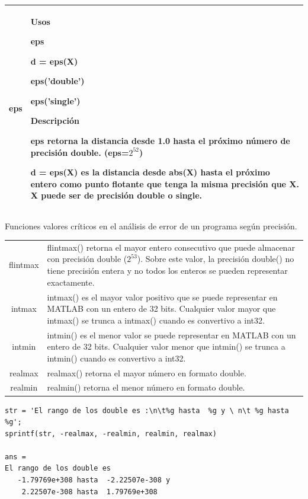 \documentclass[12pt,letterpaper]{article}
\begin{document}
\begin{longtable}{|c||p{}|}
\hline
eps		& 
Usos


eps

d = eps(X)

eps('double')

eps('single')

Descripci\'on

eps retorna la distancia desde 1.0 hasta el pr\'oximo n\'umero de precisi\'on double. (eps=$2^{52}$)

d = eps(X) es la distancia desde abs(X) hasta el pr\'oximo entero como punto flotante que tenga la misma precisi\'on que X. X puede ser de precisi\'on double o single.
\\
\hline
\end{longtable}

Funciones valores cr\'iticos en el an\'alisis de error de un programa seg\'un precisi\'on.

\begin{longtable}{|c||p{}|}
\hline
flintmax		& 	flintmax() retorna el mayor entero consecutivo que puede almacenar con precisi\'on double ($2^{53}$). Sobre este valor, la precisi\'on double() no tiene precisi\'on entera y no todos los enteros se pueden representar exactamente. \\
intmax			& 	intmax() es el mayor valor positivo que se puede representar en MATLAB con un entero de 32 bits. Cualquier valor mayor que intmax() se trunca a intmax() cuando es convertivo a int32. \\
intmin			& 	intmin() es el menor valor se puede representar en MATLAB con un entero de 32 bits. Cualquier valor menor que intmin() se trunca a intmin() cuando es convertivo a int32. \\
realmax			& 	realmax() retorna el mayor n\'umero en formato double. \\
realmin			& 	realmin() retorna el menor n\'umero en formato double. \\
\hline
\end{longtable}

\begin{verbatim}
str = 'El rango de los double es :\n\t%g hasta  %g y \ n\t %g hasta  %g';
sprintf(str, -realmax, -realmin, realmin, realmax)

ans =
El rango de los double es
   -1.79769e+308 hasta  -2.22507e-308 y
    2.22507e-308 hasta  1.79769e+308
\end{verbatim}


\end{document}
